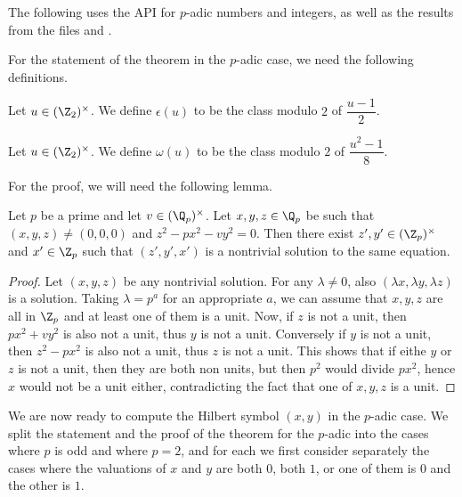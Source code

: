 The following uses the \mathlib API for $p$-adic numbers and integers, as well as the results from the files  and .


For the statement of the theorem in the $p$-adic case, we need the following definitions.


\begin{definition}
	\label{def:epsilon}
	\leanok
	Let $u \in (\Z_2)^\times$. We define $\epsilon(u)$ to be the class modulo $2$ of $\dfrac{u-1}{2}$.
\end{definition}

\begin{definition}
	\label{def:omega}
	\leanok
	Let $u \in (\Z_2)^\times$. We define $\omega(u)$ to be the class modulo $2$ of $\dfrac{u^2-1}{8}$.
\end{definition}



For the proof, we will need the following lemma.
\begin{lemma}
	\label{lem:nontrivialzero}
	\leanok
Let $p$ be a prime and let $v \in (\Q_p)^\times$. Let $x, y, z \in \Q_p$ be such that
$(x, y, z) \ne (0, 0, 0)$ and $z^2 - p x^2 - v y^2 = 0$. Then there exist
$z', y' \in (\Z_p)^\times$ and $x' \in \Z_p$ such that $(z', y', x')$ is a nontrivial solution to
the same equation.
\end{lemma}
\begin{proof}
	Let $(x,y,z)$ be any nontrivial solution. For any $\lambda \ne 0$, also $(\lambda x, \lambda y,
	\lambda z)$ is a solution. Taking $\lambda = p^a$ for an appropriate $a$, we can assume that
	$x,y,z$ are all in $\Z_p$ and at least one of them is a unit. Now, if $z$ is not a unit, then
	$px^2+vy^2$ is also not a unit, thus $y$ is not a unit. Conversely if $y$ is not a unit, then
	$z^2-px^2$ is also not a unit, thus $z$ is not a unit. This shows that if eithe $y$ or $z$ is not
	a unit, then they are both non units, but then $p^2$ would divide $px^2$, hence $x$ would not be a
	unit either, contradicting the fact that one of $x,y,z$ is a unit.
\end{proof}

We are now ready to compute the Hilbert symbol $(x,y)$ in the $p$-adic case.
We split the statement and the proof of the theorem for the $p$-adic into the cases where $p$ is odd
and where $p = 2$, and for each we first consider separately the cases where the valuations of $x$
and $y$ are both $0$, both $1$, or one of them is $0$ and the other is $1$.

